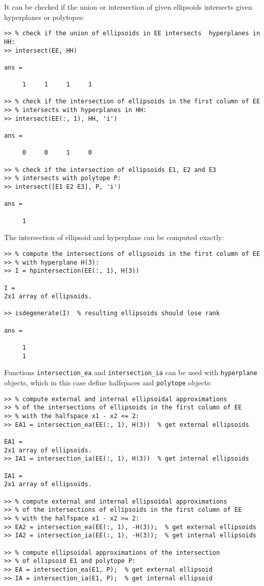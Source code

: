 It can be checked if the union or intersection of given ellipsoids intersects
given hyperplanes or polytopes:
{\tt \begin{verbatim}
>> % check if the union of ellipsoids in EE intersects  hyperplanes in HH:
>> intersect(EE, HH)

ans =

     1     1     1     1

>> % check if the intersection of ellipsoids in the first column of EE
>> % intersects with hyperplanes in HH:
>> intersect(EE(:, 1), HH, 'i')

ans =

     0     0     1     0

>> % check if the intersection of ellipsoids E1, E2 and E3
>> % intersects with polytope P:
>> intersect([E1 E2 E3], P, 'i')

ans =

     1
\end{verbatim} }
The intersection of ellipsoid and hyperplane can be computed exactly:
{\tt \begin{verbatim}
>> % compute the intersections of ellipsoids in the first column of EE
>> % with hyperplane H(3):
>> I = hpintersection(EE(:, 1), H(3))

I =
2x1 array of ellipsoids.

>> isdegenerate(I)  % resulting ellipsoids should lose rank

ans =

     1
     1
\end{verbatim} }
Functions {\tt intersection\_ea} and {\tt intersection\_ia} can be used
with {\tt hyperplane} objects, which in this case define halfspaces and
{\tt polytope} objects:
{\tt \begin{verbatim}
>> % compute external and internal ellipsoidal approximations
>> % of the intersections of ellipsoids in the first column of EE
>> % with the halfspace x1 - x2 <= 2:
>> EA1 = intersection_ea(EE(:, 1), H(3))  % get external ellipsoids

EA1 =
2x1 array of ellipsoids.
>> IA1 = intersection_ia(EE(:, 1), H(3))  % get internal ellipsoids

IA1 =
2x1 array of ellipsoids.

>> % compute external and internal ellipsoidal approximations
>> % of the intersections of ellipsoids in the first column of EE
>> % with the halfspace x1 - x2 >= 2:
>> EA2 = intersection_ea(EE(:, 1), -H(3));  % get external ellipsoids
>> IA2 = intersection_ia(EE(:, 1), -H(3));  % get internal ellipsoids

>> % compute ellipsoidal approximations of the intersection
>> % of ellipsoid E1 and polytope P:
>> EA = intersection_ea(E1, P);  % get external ellipsoid
>> IA = intersection_ia(E1, P);  % get internal ellipsoid
\end{verbatim} }
